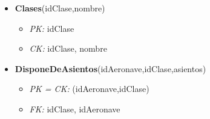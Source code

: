 \begin{itemize}
\begin{itemize}
		\end{itemize}
	\item \textbf{Clases}(idClase,nombre)
		\begin{itemize}
			\item \textit{PK: } idClase
			\item \textit{CK: } idClase, nombre
		\end{itemize}
	\item \textbf{DisponeDeAsientos}(idAeronave,idClase,asientos)
		\begin{itemize}
			\item \textit{PK = CK: } (idAeronave,idClase)
			\item \textit{FK: } idClase, idAeronave	
		\end{itemize}
\end{itemize}	
